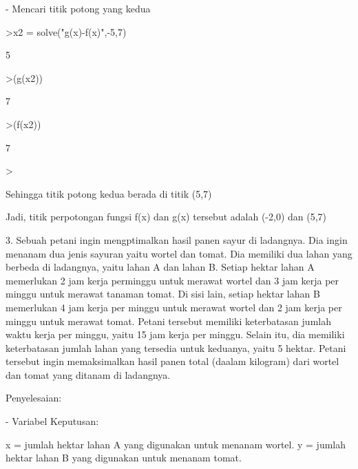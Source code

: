 \documentclass{article}
\begin{document}
\begin{eulernotebook}
\begin{eulercomment}
\begin{eulercomment}
\begin{eulercomment}
\begin{eulercomment}
\begin{eulercomment}
- Mencari titik potong yang kedua
\end{eulercomment}
\begin{eulerprompt}
>x2 = solve("g(x)-f(x)",-5,7)
\end{eulerprompt}
\begin{euleroutput}
  5
\end{euleroutput}
\begin{eulerprompt}
>(g(x2))
\end{eulerprompt}
\begin{euleroutput}
  7
\end{euleroutput}
\begin{eulerprompt}
>(f(x2))
\end{eulerprompt}
\begin{euleroutput}
  7
\end{euleroutput}
\begin{eulerprompt}
> 
\end{eulerprompt}
\begin{eulercomment}
Sehingga titik potong kedua berada di titik (5,7)

Jadi, titik perpotongan fungsi f(x) dan g(x) tersebut adalah (-2,0)
dan (5,7)

3. Sebuah petani ingin mengptimalkan hasil panen sayur di ladangnya.
Dia ingin menanam dua jenis sayuran yaitu wortel dan tomat. Dia
memiliki dua lahan yang berbeda di ladangnya, yaitu lahan A dan lahan
B. Setiap hektar lahan A memerlukan 2 jam kerja perminggu untuk
merawat wortel dan 3 jam kerja per minggu untuk merawat tanaman tomat.
Di sisi lain, setiap hektar lahan B memerlukan 4 jam kerja per minggu
untuk merawat wortel dan 2 jam kerja per minggu untuk merawat tomat.
Petani tersebut memiliki keterbatasan jumlah waktu kerja per minggu,
yaitu 15 jam kerja per minggu. Selain itu, dia memiliki keterbatasan
jumlah lahan yang tersedia untuk keduanya, yaitu 5 hektar. Petani
tersebut ingin memaksimalkan hasil panen total (daalam kilogram) dari
wortel dan tomat yang ditanam di ladangnya.

Penyelesaian:

- Variabel Keputusan:\\
\end{eulercomment}
\begin{eulerttcomment}
  x = jumlah hektar lahan A yang digunakan untuk menanam wortel.
  y = jumlah hektar lahan B yang digunakan untuk menanam tomat.
\end{eulerttcomment}
\begin{eulercomment}


\end{eulercomment}
\end{eulercomment}
\end{eulercomment}
\end{eulercomment}
\end{eulercomment}
\end{eulernotebook}
\end{document}
